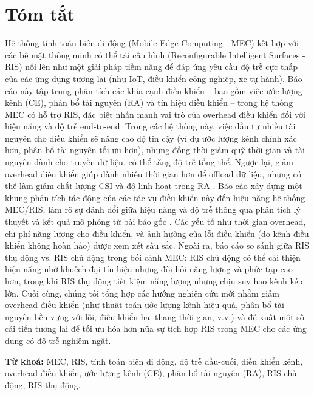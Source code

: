 \documentclass[12pt]{report}
\begin{document}
\chapter*{Tóm tắt}
Hệ thống tính toán biên di động (Mobile Edge Computing - MEC) kết hợp với các bề mặt thông minh có thể tái cấu hình (Reconfigurable Intelligent Surfaces - RIS) nổi lên như một giải pháp tiềm năng để đáp ứng yêu cầu độ trễ cực thấp của các ứng dụng tương lai (như IoT, điều khiển công nghiệp, xe tự hành). Báo cáo này tập trung phân tích các khía cạnh điều khiển – bao gồm việc ước lượng kênh (CE), phân bổ tài nguyên (RA) và tín hiệu điều khiển – trong hệ thống MEC có hỗ trợ RIS, đặc biệt nhấn mạnh vai trò của overhead điều khiển đối với hiệu năng và độ trễ end-to-end. Trong các hệ thống này, việc đầu tư nhiều tài nguyên cho điều khiển sẽ nâng cao độ tin cậy (ví dụ ước lượng kênh chính xác hơn, phân bổ tài nguyên tối ưu hơn), nhưng đồng thời giảm quỹ thời gian và tài nguyên dành cho truyền dữ liệu, có thể tăng độ trễ tổng thể. Ngược lại, giảm overhead điều khiển giúp dành nhiều thời gian hơn để offload dữ liệu, nhưng có thể làm giảm chất lượng CSI và độ linh hoạt trong RA
. Báo cáo xây dựng một khung phân tích tác động của các tác vụ điều khiển này đến hiệu năng hệ thống MEC/RIS, làm rõ sự đánh đổi giữa hiệu năng và độ trễ thông qua phân tích lý thuyết và kết quả mô phỏng từ bài báo gốc \cite{ris_latency}. Các yếu tố như thời gian overhead, chi phí năng lượng cho điều khiển, và ảnh hưởng của lỗi điều khiển (do kênh điều khiển không hoàn hảo) được xem xét sâu sắc. Ngoài ra, báo cáo so sánh giữa RIS thụ động vs. RIS chủ động trong bối cảnh MEC: RIS chủ động có thể cải thiện hiệu năng nhờ khuếch đại tín hiệu nhưng đòi hỏi năng lượng và phức tạp cao hơn, trong khi RIS thụ động tiết kiệm năng lượng nhưng chịu suy hao kênh kép lớn. Cuối cùng, chúng tôi tổng hợp các hướng nghiên cứu mới nhằm giảm overhead điều khiển (như thuật toán ước lượng kênh hiệu quả, phân bổ tài nguyên bền vững với lỗi, điều khiển hai thang thời gian, v.v.) và đề xuất một số cải tiến tương lai để tối ưu hóa hơn nữa sự tích hợp RIS trong MEC cho các ứng dụng có độ trễ nghiêm ngặt.

\textbf{Từ khoá:} MEC, RIS, tính toán biên di động, độ trễ đầu-cuối, điều khiển kênh, overhead điều khiển, ước lượng kênh (CE), phân bổ tài nguyên (RA), RIS chủ động, RIS thụ động.

\tableofcontents



\end{document}

